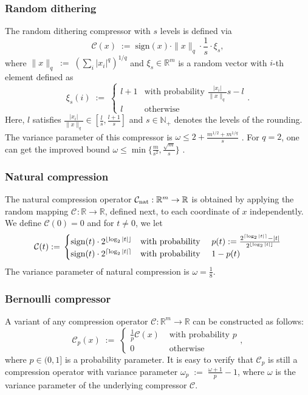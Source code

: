 \documentclass[12pt]{article}
\newcommand{\eqdef}{\; { := }\;}
\newcommand{\R}{\mathbb{R}}
\newcommand{\cC}{{\mathcal{C}}}
\begin{document}
\subsubsection{Random dithering} The random dithering compressor \citep{Alistarh17, DIANA2} with $s$ levels is defined via 
$$\cC(x)\eqdef \text{sign}(x)\cdot \|x\|_q\cdot \frac{1}{s} \cdot \xi_s,$$ 
where $\|x\|_q\eqdef \left(\sum_i |x_i|^q\right)^{1/q}$ and $\xi_s\in\R^m$ is a random vector with 
$i$-th element  defined as
$$\xi_s(i)\eqdef \begin{cases}
	l+1 &\text {with probability } \frac{|x_i|}{\|x\|_q}s- l \\
	l &\text {otherwise}
\end{cases}.$$ Here, $l$ satisfies $\frac{|x_i|}{\|x\|_q}\in [\frac{l}{s}, \frac{l+1}{s}]$ and $s \in \mathbb{N}_+$ denotes the levels of the rounding. The variance parameter of this compressor is $\omega \leq 2 + \frac{m^{1/2} + m^{1/q}}{s}$ \citep{DIANA2}. For $q=2$, one can get the improved bound $\omega \leq \min\{  \frac{m}{s^2}, \frac{\sqrt{m}}{s}  \}$ \citep{Alistarh17}.  

\subsubsection{Natural compression} The natural compression  \citep{Cnat} operator $\cC_{\rm nat}:\R^m \to \R$ is obtained by applying the random mapping $\cC_{}:\R\to \R$, defined next, to each coordinate of $x$ independently. We define $\cC(0)=0$ and for $t\neq 0$, we let
$$
\cC(t) \eqdef \begin{cases}
	{\rm sign}(t) \cdot 2^{\lfloor \log_2|t| \rfloor } &\text {with probability } \quad p(t) \eqdef \frac{2^{\lceil \log_2|t| \rceil } - |t|}{2^{\lfloor \log_2|t| \rfloor }} \\
	{\rm sign}(t) \cdot 2^{\lceil \log_2|t| \rceil } &\text {with probability } \quad 1-p(t) 
\end{cases}
$$
The variance parameter of natural compression is $\omega = \frac{1}{8}$. 


\subsubsection{Bernoulli compressor} \label{sec:Bernoulli}
A variant of any compression operator $\cC:\R^m \to \R$ can be constructed as follows:
\begin{equation}\label{eq:Qp}
	\cC_p(x) \eqdef \left\{ \begin{array}{rl}
		\frac{1}{p}\cC(x) & \mbox{ with probability $p$} \\
		0 &\mbox{ otherwise}
	\end{array}, \right.
\end{equation}
where $p\in (0, 1]$ is a probability parameter. It is easy to verify that $\cC_p$ is still a compression operator with variance parameter $\omega_p \eqdef \frac{\omega+1}{p} - 1$, where $\omega$ is the variance parameter of the underlying compressor $\cC$.
\end{document}
